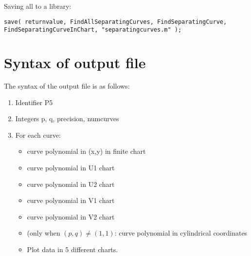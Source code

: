 \documentclass[a4paper,10pt]{article}
\begin{document}
Saving all to a library:

\begin{lstlisting}[name=separatingcurves]
save( returnvalue, FindAllSeparatingCurves, FindSeparatingCurve, FindSeparatingCurveInChart, "separatingcurves.m" );
\end{lstlisting}

\section{Syntax of output file}

The syntax of the output file is as follows:

\begin{enumerate}
\item
    Identifier P5
\item
    Integers p, q, precision, numcurves
\item
    For each curve:
    \begin{itemize}
    \item
        curve polynomial in (x,y) in finite chart
    \item
        curve polynomial in U1 chart
    \item
        curve polynomial in U2 chart
    \item
        curve polynomial in V1 chart
    \item
        curve polynomial in V2 chart
    \item
        (only when $(p,q)\not=(1,1)$: curve polynomial in cylindrical coordinates
    \item
        Plot data in 5 different charts.
    \end{itemize}
\end{enumerate}
\end{document}
